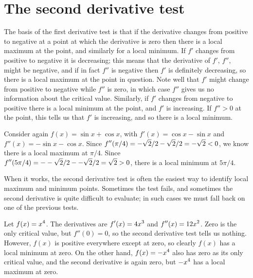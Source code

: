 




\section{The second derivative test} {}{}
\nobreak
The basis of the first derivative test is that if the derivative
changes from positive to negative at a point at which the derivative
is zero then there is a local maximum at the point, and similarly for
a local minimum. If $f'$ changes from positive to negative it is
decreasing; this means that the derivative of $f'$, $f''$, might be negative,
and if in fact $f''$ is negative then $f'$ is definitely
decreasing, so there is a local maximum at the point in question. Note
well that $f'$ might change from positive to negative while $f''$ is
zero, in which case $f''$ gives us no information about the critical
value. Similarly, if $f'$ changes from negative to positive there is a
local minimum at the point, and $f'$ is increasing. If $f''>0$ at the
point, this tells us that $f'$ is increasing, and so there is a local
minimum. 

\begin{example}
Consider again $f(x)=\sin x + \cos x$, with $f'(x)=\cos x-\sin x$ and
$ f''(x)=-\sin x -\cos x$. Since $\displaystyle f''(\pi/4)=-\sqrt{2}/2-\sqrt2/2=-\sqrt2<0$,
we know there is a local maximum at $\pi/4$. Since
$\displaystyle f''(5\pi/4)=--\sqrt{2}/2--\sqrt2/2=\sqrt2>0$, there is a local
minimum at $5\pi/4$.
\end{example}

When it works, the second derivative test is often the easiest way to
identify local maximum and minimum points. Sometimes the test fails,
and sometimes the second derivative is quite difficult to evaluate; in
such cases we must fall back on one of the previous tests.

\begin{example}
Let $\displaystyle f(x)=x^4$. The derivatives are $\displaystyle f'(x)=4x^3$ and
$\displaystyle f''(x)=12x^2$. Zero is the only critical value, but $f''(0)=0$, so
the second derivative test tells us nothing. However, $f(x)$ is
positive everywhere except at zero, so clearly $f(x)$ has a local
minimum at zero. On the other hand, $\displaystyle f(x)=-x^4$ also has zero as its
only critical value, and the second derivative is again zero, but
$\displaystyle -x^4$ has a local maximum at zero.
\end{example}

